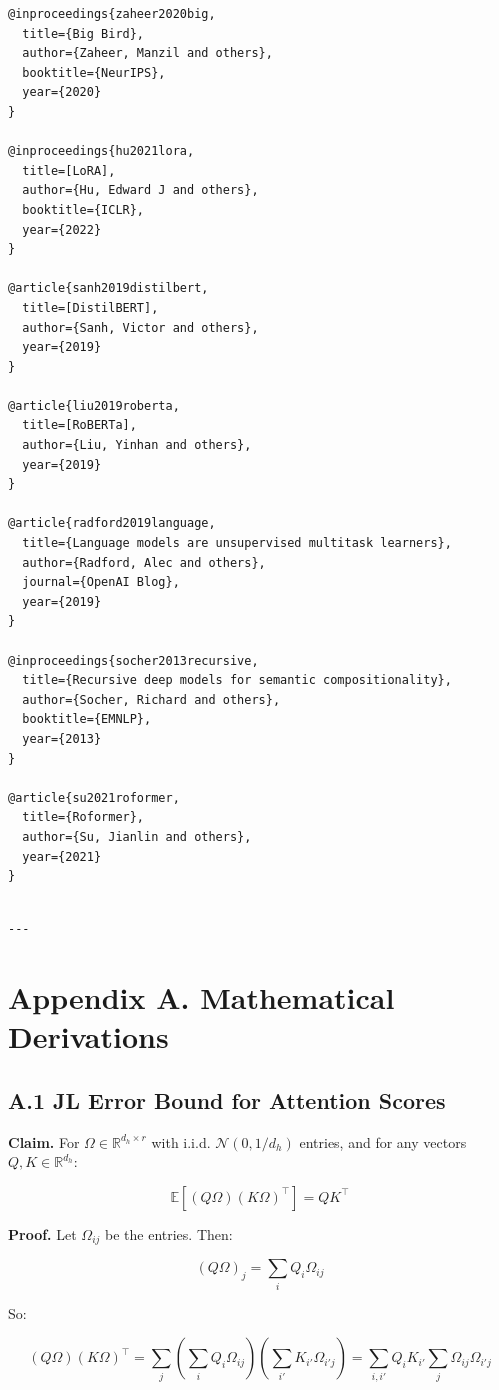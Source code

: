 \begin{lstlisting}
@inproceedings{zaheer2020big,
  title={Big Bird},
  author={Zaheer, Manzil and others},
  booktitle={NeurIPS},
  year={2020}
}

@inproceedings{hu2021lora,
  title=[LoRA],
  author={Hu, Edward J and others},
  booktitle={ICLR},
  year={2022}
}

@article{sanh2019distilbert,
  title=[DistilBERT],
  author={Sanh, Victor and others},
  year={2019}
}

@article{liu2019roberta,
  title=[RoBERTa],
  author={Liu, Yinhan and others},
  year={2019}
}

@article{radford2019language,
  title={Language models are unsupervised multitask learners},
  author={Radford, Alec and others},
  journal={OpenAI Blog},
  year={2019}
}

@inproceedings{socher2013recursive,
  title={Recursive deep models for semantic compositionality},
  author={Socher, Richard and others},
  booktitle={EMNLP},
  year={2013}
}

@article{su2021roformer,
  title={Roformer},
  author={Su, Jianlin and others},
  year={2021}
}
\end{lstlisting}
\begin{lstlisting}

---
\end{lstlisting}


\section{Appendix A. Mathematical Derivations}

\subsection{A.1 JL Error Bound for Attention Scores}

\textbf{Claim.} For $\Omega \in \mathbb{R}^{d_h \times r}$ with i.i.d. 
$\mathcal{N}(0, 1/d_h)$ entries, and for any vectors $Q, K \in \mathbb{R}^{d_h}$:

\[
\mathbb{E}[(Q\Omega)(K\Omega)^\top] = Q K^\top
\tag{A.1}
\]

\textbf{Proof.} Let $\Omega_{ij}$ be the entries. Then:

\[
(Q\Omega)_j = \sum_i Q_i \Omega_{ij}
\]

So:

\[
(Q\Omega)(K\Omega)^\top = \sum_j \left(\sum_i Q_i \Omega_{ij}\right) \left(\sum_{i'} K_{i'} \Omega_{i'j}\right)
= \sum_{i, i'} Q_i K_{i'} \sum_j \Omega_{ij} \Omega_{i'j}
\]


